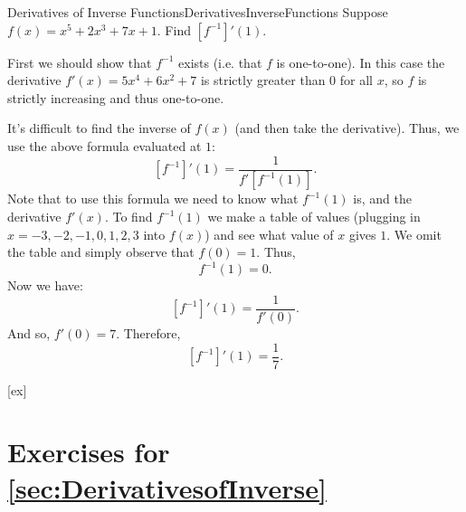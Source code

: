


\begin{example}{Derivatives of Inverse Functions}{DerivativesInverseFunctions}
Suppose $f(x)=x^5+2x^3+7x+1$.
Find $\left[f^{-1}\right]'(1)$.
\end{example}

\begin{solution} 
First we should show that $f^{-1}$ exists (i.e. that $f$ is one-to-one). In this case the derivative $f'(x)=5x^4+6x^2+7$ is strictly greater than 0 for all $x$, so $f$ is strictly increasing and thus one-to-one.

It's difficult to find the inverse of $f(x)$ (and then take the derivative).
Thus, we use the above formula evaluated at $1$:
$$\left[f^{-1}\right]'(1)=\frac{1}{f'\left[ f^{-1}(1) \right]}.$$
Note that to use this formula we need to know what $f^{-1}(1)$ is, and the derivative $f'(x)$.
To find $f^{-1}(1)$ we make a table of values (plugging in $x=-3,-2,-1,0,1,2,3$ into $f(x)$) and see what value of $x$ gives $1$.
We omit the table and simply observe that $f(0)=1$.
Thus, 
$$f^{-1}(1)=0.$$
Now we have:
$$\left[f^{-1}\right]'(1)=\frac{1}{f'\left( 0 \right)}.$$
And so, $f'(0)=7$.
Therefore, $$\left[f^{-1}\right]'(1)=\frac{1}{7}.$$
\end{solution}




[ex]
\section*{Exercises for \ref{sec:DerivativesofInverse}}

